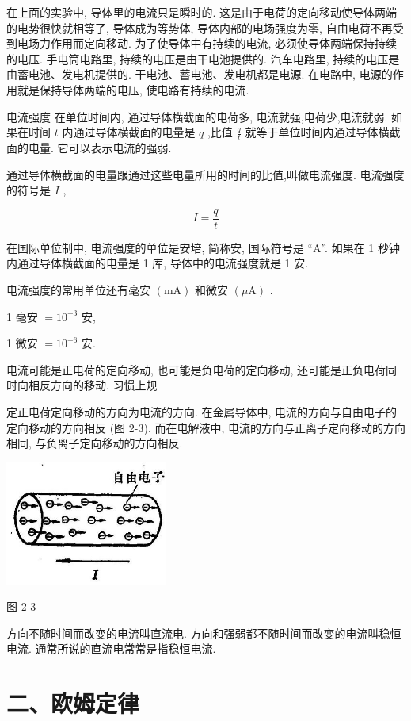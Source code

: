 \documentclass[10pt]{article}
\begin{document}
在上面的实验中, 导体里的电流只是瞬时的. 这是由于电荷的定向移动使导体两端的电势很快就相等了, 导体成为等势体, 导体内部的电场强度为零, 自由电荷不再受到电场力作用而定向移动. 为了使导体中有持续的电流, 必须使导体两端保持持续的电压. 手电筒电路里, 持续的电压是由干电池提供的. 汽车电路里, 持续的电压是由蓄电池、发电机提供的. 干电池、蓄电池、发电机都是电源. 在电路中, 电源的作用就是保持导体两端的电压, 使电路有持续的电流.

电流强度 在单位时间内, 通过导体横截面的电荷多, 电流就强,电荷少,电流就弱. 如果在时间 \(t\) 内通过导体横截面的电量是 \(q\) ,比值 \(\frac{q}{t}\) 就等于单位时间内通过导体横截面的电量. 它可以表示电流的强弱.

通过导体横截面的电量跟通过这些电量所用的时间的比值,叫做电流强度. 电流强度的符号是 \(I\) ,

\[
I = \frac{q}{t}
\]

在国际单位制中, 电流强度的单位是安培, 简称安, 国际符号是 “A”. 如果在 1 秒钟内通过导体横截面的电量是 1 库, 导体中的电流强度就是 1 安.

电流强度的常用单位还有毫安 \(\left( \mathrm{{mA}}\right)\) 和微安 \(\left( {\mu \mathrm{A}}\right)\) .

1 毫安 \(= {10}^{-3}\) 安,

1 微安 \(= {10}^{-6}\) 安.

电流可能是正电荷的定向移动, 也可能是负电荷的定向移动, 还可能是正负电荷同时向相反方向的移动. 习惯上规

定正电荷定向移动的方向为电流的方向. 在金属导体中, 电流的方向与自由电子的定向移动的方向相反 (图 2-3). 而在电解液中, 电流的方向与正离子定向移动的方向相同, 与负离子定向移动的方向相反.

\begin{center}
\includegraphics[max width=0.4\textwidth]{images/01913056-1f15-74d8-9184-9aab52c9d66b_61_373628.jpg}
\end{center}

图 2-3

方向不随时间而改变的电流叫直流电. 方向和强弱都不随时间而改变的电流叫稳恒电流. 通常所说的直流电常常是指稳恒电流.

\section*{二、欧姆定律}
\end{document}
